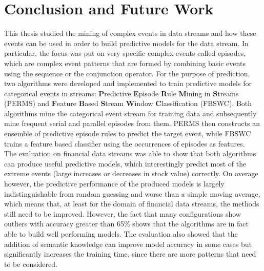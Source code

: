 \chapter{Conclusion and Future Work}
\label{chapter_conclusion}

\ifpdf
    \graphicspath{{Chapter7/Figs/Raster/}{Chapter7/Figs/PDF/}{Chapter7/Figs/}}
\else
    \graphicspath{{Chapter7/Figs/Vector/}{Chapter7/Figs/}}
\fi

This thesis studied the mining of complex events in data streams and how these events can be used in order to build predictive models for the data stream. In particular, the focus was put on very specific complex events called episodes, which are complex event patterns that are formed by combining basic events using the sequence or the conjunction operator. For the purpose of prediction, two algorithms were developed and implemented to train predictive models for categorical events in streams: \textbf{P}redictive \textbf{E}pisode \textbf{R}ule \textbf{M}ining in \textbf{S}treams (PERMS) and \textbf{F}eature \textbf{B}ased \textbf{S}tream \textbf{W}indow \textbf{C}lassification (FBSWC). Both algorithms mine the categorical event stream for training data and subsequently mine frequent serial and parallel episodes from them. PERMS then constructs an ensemble of predictive episode rules to predict the target event, while FBSWC trains a feature based classifier using the occurrences of episodes as features. \\
The evaluation on financial data streams was able to show that both algorithms can produce useful predictive models, which interestingly predict most of the extreme events (large increases or decreases in stock value) correctly. On average however, the predictive performance of the produced models is largely indistinguishable from random guessing and worse than a simple moving average, which means that, at least for the domain of financial data streams, the methods still need to be improved. However, the fact that many configurations show outliers with accuracy greater than 65\% shows that the algorithms are in fact able to build well performing models. The evaluation also showed that the addition of semantic knowledge can improve model accuracy in some cases but significantly increases the training time, since there are more patterns that need to be considered.\\
